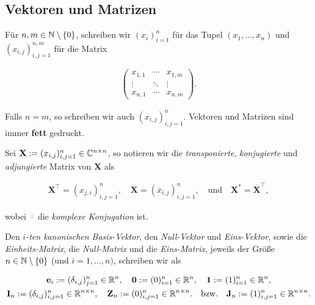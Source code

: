         \subsection{Vektoren und Matrizen}

            Für $n, m \in \mathbb N \setminus {\left \{ 0 \right \}}$, schreiben wir $(x_i)_{i=1}^n$ für das Tupel $(x_1, \dots, x_n)$ und $(x_{i, j})_{i, j = 1}^{n, m}$ für die Matrix

            \begin{align*}
                \begin{pmatrix}
                    x_{1, 1} & \cdots & x_{1, m} \\
                    \vdots   & \ddots & \vdots   \\
                    x_{n, 1} & \cdots & x_{n, m}
                \end{pmatrix}.
            \end{align*}

            Falls $n = m$, so schreiben wir auch $(x_{i, j})_{i, j = 1}^n$.
            Vektoren und Matrizen sind immer \textbf{fett} gedruckt.

            Sei $\mathbf X := (x_{i, j})_{i, j = 1}^n \in \mathbb C^{n \times n}$, so notieren wir die \textit{transponierte}, \textit{konjugierte} und \textit{adjungierte} Matrix von $\mathbf X$ als

            \begin{align*}
                \mathbf X^\top = (x_{j, i})_{i, j = 1}^n,
                \quad
                \overline {\mathbf X} = (\overline x_{i, j})_{i, j = 1}^n,
                \quad
                \text{und}
                \quad
                \mathbf X^\ast = \overline {\mathbf X}^\top,
            \end{align*}

            wobei $\overline \cdot$ die \textit{komplexe Konjugation} ist.

            Den \textit{$i$-ten kanonischen Basis-Vektor}, den \textit{Null-Vektor} und \textit{Eins-Vektor}, sowie die \textit{Einheits-Matrix}, die \textit{Null-Matrix} und die \textit{Eins-Matrix}, jeweils der Größe $n \in \mathbb N \setminus {\left \{ 0 \right \}}$ (und $i = 1, \dots, n)$, schreiben wir als

            \begin{gather*}
                \mathbf e_i := (\delta_{i, j})_{j=1}^n \in \mathbb R^n,
                \quad
                \mathbf 0 := (0)_{i=1}^n \in \mathbb R^n,
                \quad
                \mathbf 1 := (1)_{i=1}^n \in \mathbb R^n, \\
                \mathbf I_n := (\delta_{i, j})_{i, j = 1}^n \in \mathbb R^{n \times n},
                \quad
                \mathbf Z_n := (0)_{i, j = 1}^n \in \mathbb R^{n \times n}.
                \quad
                \text{bzw.}
                \quad
                \mathbf J_n := (1)_{i, j = 1}^n \in \mathbb R^{n \times n}.
            \end{gather*}


